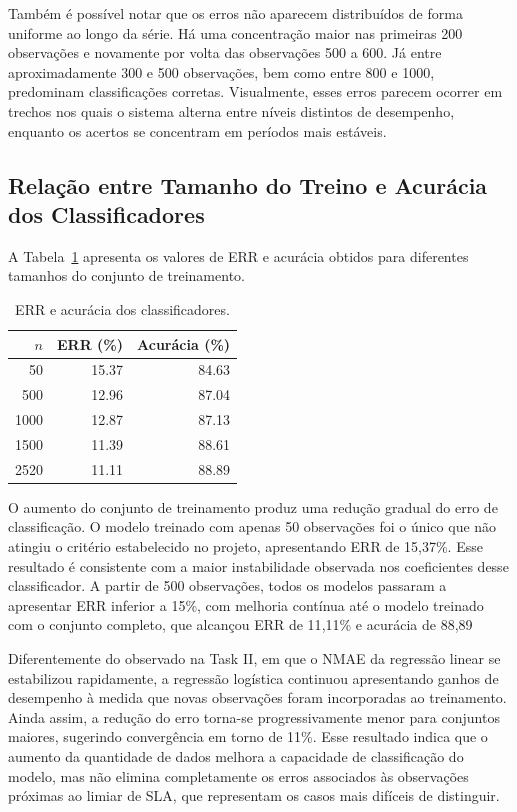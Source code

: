\documentclass[11pt,a4paper]{article}
\begin{document}
Também é possível notar que os erros não aparecem distribuídos de forma uniforme ao longo da série. Há uma concentração maior nas primeiras 200 observações e novamente por volta das observações 500 a 600. Já entre aproximadamente 300 e 500 observações, bem como entre 800 e 1000, predominam classificações corretas. Visualmente, esses erros parecem ocorrer em trechos nos quais o sistema alterna entre níveis distintos de desempenho, enquanto os acertos se concentram em períodos mais estáveis.

\subsection{Relação entre Tamanho do Treino e Acurácia dos Classificadores} 

A Tabela~\ref{tab:err_accuracy} apresenta os valores de ERR e acurácia obtidos para diferentes tamanhos do conjunto de treinamento.

\begin{table}[H]
\centering
\caption{ERR e acurácia dos classificadores.}
\label{tab:err_accuracy}
\begin{tabular}{rrr}
\toprule
\textbf{$n$} & \textbf{ERR (\%)} & \textbf{Acurácia (\%)} \\
\midrule
50   & 15.37 & 84.63 \\
500  & 12.96 & 87.04 \\
1000 & 12.87 & 87.13 \\
1500 & 11.39 & 88.61 \\
2520 & 11.11 & 88.89 \\
\bottomrule
\end{tabular}
\end{table}

O aumento do conjunto de treinamento produz uma redução gradual do erro de classificação. O modelo treinado com apenas 50 observações foi o único que não atingiu o critério estabelecido no projeto, apresentando ERR de 15{,}37\%. Esse resultado é consistente com a maior instabilidade observada nos coeficientes desse classificador. A partir de 500 observações, todos os modelos passaram a apresentar ERR inferior a 15\%, com melhoria contínua até o modelo treinado com o conjunto completo, que alcançou ERR de 11{,}11\% e acurácia de 88,89%

Diferentemente do observado na Task II, em que o NMAE da regressão linear se estabilizou rapidamente, a regressão logística continuou apresentando ganhos de desempenho à medida que novas observações foram incorporadas ao treinamento. Ainda assim, a redução do erro torna-se progressivamente menor para conjuntos maiores, sugerindo convergência em torno de 11\%. Esse resultado indica que o aumento da quantidade de dados melhora a capacidade de classificação do modelo, mas não elimina completamente os erros associados às observações próximas ao limiar de SLA, que representam os casos mais difíceis de distinguir.
\end{document}

